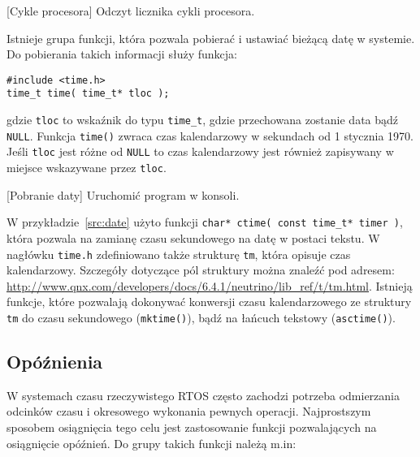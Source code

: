 \begin{example}{[Cykle procesora]} Odczyt licznika cykli procesora.

\end{example} 

Istnieje grupa funkcji, która pozwala pobierać i ustawiać bieżącą datę w systemie. Do pobierania takich informacji służy funkcja: 

\begin{lstlisting}[style=MyCStyle]
#include <time.h>
time_t time( time_t* tloc );
\end{lstlisting}

gdzie \lstinline[style=MyCStyle]{tloc} to wskaźnik do typu \lstinline[style=MyCStyle]{time_t}, gdzie przechowana zostanie data bądź \lstinline[style=MyCStyle]{NULL}. Funkcja \lstinline[style=MyCStyle]{time()} zwraca czas kalendarzowy w sekundach od 1 stycznia 1970. Jeśli \lstinline[style=MyCStyle]{tloc} jest różne od \lstinline[style=MyCStyle]{NULL} to czas kalendarzowy jest również zapisywany w miejsce wskazywane przez \lstinline[style=MyCStyle]{tloc}. 

\begin{example}{[Pobranie daty]} Uruchomić program w konsoli.

\end{example} 

W przykładzie~\ref{src:date} użyto funkcji \lstinline[style=MyCStyle]{char* ctime( const time_t* timer )}, która pozwala na zamianę czasu sekundowego na datę w postaci tekstu. W nagłówku \lstinline[style=MyCStyle]{time.h} zdefiniowano także strukturę \lstinline[style=MyCStyle]{tm}, która opisuje czas kalendarzowy. Szczegóły dotyczące pól struktury można znaleźć pod adresem: \url{http://www.qnx.com/developers/docs/6.4.1/neutrino/lib_ref/t/tm.html}. Istnieją funkcje, które pozwalają dokonywać konwersji czasu kalendarzowego ze struktury \lstinline[style=MyCStyle]{tm} do czasu sekundowego (\lstinline[style=MyCStyle]{mktime()}), bądź na łańcuch tekstowy (\lstinline[style=MyCStyle]{asctime()}). 

\subsection{Opóźnienia}

W systemach czasu rzeczywistego RTOS często zachodzi potrzeba odmierzania odcinków czasu i okresowego wykonania pewnych operacji. Najprostszym sposobem osiągnięcia tego celu jest zastosowanie funkcji pozwalających na osiągnięcie opóźnień. Do grupy takich funkcji należą m.in: 

